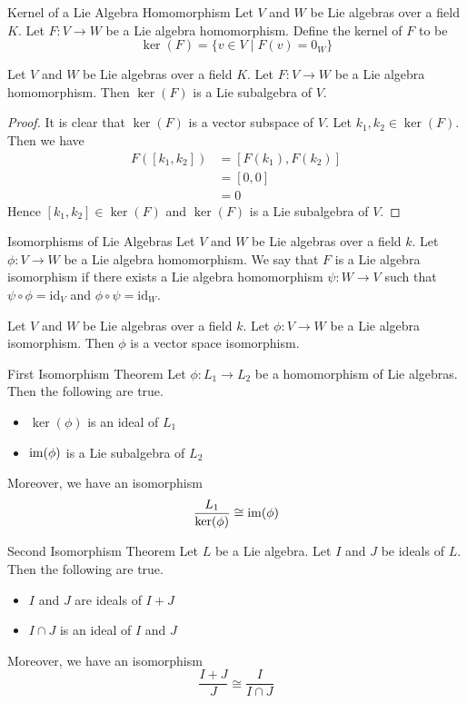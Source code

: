 \documentclass[a4paper]{article}
\begin{document}
\begin{defn}{Kernel of a Lie Algebra Homomorphism}{} Let $V$ and $W$ be Lie algebras over a field $K$. Let $F:V\to W$ be a Lie algebra homomorphism. Define the kernel of $F$ to be $$\ker(F)=\{v\in V\;|\;F(v)=0_W\}$$
\end{defn}

\begin{lmm}{}{} Let $V$ and $W$ be Lie algebras over a field $K$. Let $F:V\to W$ be a Lie algebra homomorphism. Then $\ker(F)$ is a Lie subalgebra of $V$. \tcbline
\begin{proof}
It is clear that $\ker(F)$ is a vector subspace of $V$. Let $k_1,k_2\in\ker(F)$. Then we have 
\begin{align*}
F([k_1,k_2])&=[F(k_1),F(k_2)]\tag{$F$ is a Lie algebra homomorphism}\\
&=[0,0]\\
&=0
\end{align*}
Hence $[k_1,k_2]\in\ker(F)$ and $\ker(F)$ is a Lie subalgebra of $V$. 
\end{proof}
\end{lmm}

\begin{defn}{Isomorphisms of Lie Algebras}{} Let $V$ and $W$ be Lie algebras over a field $k$. Let $\phi:V\to W$ be a Lie algebra homomorphism. We say that $F$ is a Lie algebra isomorphism if there exists a Lie algebra homomorphism $\psi:W\to V$ such that $\psi\circ\phi=\text{id}_V$ and $\phi\circ\psi=\text{id}_W$. 
\end{defn}

\begin{prp}{}{} Let $V$ and $W$ be Lie algebras over a field $k$. Let $\phi:V\to W$ be a Lie algebra isomorphism. Then $\phi$ is a vector space isomorphism. 
\end{prp}

\begin{thm}{First Isomorphism Theorem}{} Let $\phi:L_1\to L_2$ be a homomorphism of Lie algebras. Then the following are true. 
\begin{itemize}
\item $\ker(\phi)$ is an ideal of $L_1$
\item $\operatorname{im}(\phi)$ is a Lie subalgebra of $L_2$
\end{itemize}
Moreover, we have an isomorphism $$\frac{L_1}{\ker(\phi)}\cong\operatorname{im}(\phi)$$
\end{thm}

\begin{thm}{Second Isomorphism Theorem}{} Let $L$ be a Lie algebra. Let $I$ and $J$ be ideals of $L$. Then the following are true. 
\begin{itemize}
\item $I$ and $J$ are ideals of $I+J$
\item $I\cap J$ is an ideal of $I$ and $J$
\end{itemize}
Moreover, we have an isomorphism $$\frac{I+J}{J}\cong\frac{I}{I\cap J}$$
\end{thm}
\end{document}
